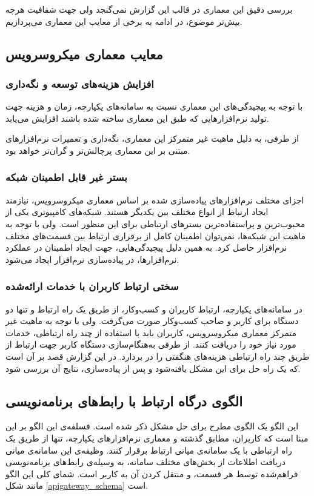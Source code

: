 بررسی دقیق این معماری در قالب این گزارش نمی‌گنجد ولی جهت شفافیت هرچه بیش‌تر موضوع، در ادامه به برخی از معایب این معماری می‌پردازیم.


\subsection{معایب معماری میکروسرویس}\label{subsec:intro_microissues}
\subsubsection{افزایش هزینه‌های توسعه و نگه‌داری}
با توجه به پیچیدگی‌های این معماری نسبت به سامانه‌های یکپارچه، زمان و هزینه جهت تولید نرم‌افزار‌هایی که طبق این معماری ساخته شده باشند افزایش می‌یابد.

از طرفی، به دلیل ماهیت غیر متمرکز این معماری، نگه‌داری و تعمیرات نرم‌افزار‌های مبتنی بر این معماری پرچالش‌تر و گران‌تر خواهد بود.

\subsubsection{بستر غیر قابل اطمینان شبکه}
اجزای مختلف نرم‌افزار‌های پیاده‌سازی شده بر اساس معماری میکروسرویس، نیازمند ایجاد ارتباط از انواع مختلف بین یکدیگر هستند. شبکه‌های کامپیوتری یکی از محبوب‌ترین و پراستفاده‌ترین بستر‌های ارتباطی برای این منظور است. ولی با توجه به ماهیت این شبکه‌ها، نمی‌توان اطمینان کامل از برقراری ارتباط بین قسمت‌های مختلف نرم‌افزار حاصل کرد. به همین دلیل پیچیدگی‌هایی، جهت ایجاد اطمینان در عملکرد نرم‌افزار‌ها، در پیاده‌سازی نرم‌افزار ایجاد می‌شود.


\subsubsection{سختی ارتباط کاربران با خدمات ارائه‌شده}
در سامانه‌های یکپارچه، ارتباط کاربران و کسب‌و‌کار، از طریق یک راه ارتباط و تنها دو دستگاه برای کاربر و صاحب کسب‌و‌کار صورت می‌گرفت. ولی با توجه به ماهیت غیر متمرکز معماری میکروسرویس، کاربران باید با استفاده‌ از چند راه ارتباطی، خدمات مورد نیاز خود را دریافت کنند. از طرفی به‌هنگام‌سازی دستگاه کاربر جهت ارتباط از طریق چند راه ارتباطی هزینه‌های هنگفتی را در بر‌دارد. در این گزارش قصد بر آن است که یک راه حل برای این مشکل یافته‌شود و پس از پیاده‌سازی، نتایج آن بررسی شود. 

\subsection{الگوی درگاه ارتباط با رابط‌های برنامه‌نویسی}
این الگو یک الگوی مطرح برای حل مشکل ذکر شده است. فسلفه‌ی این الگو بر این مبنا است که کاربران، مطابق گذشته و معماری نرم‌افزار‌های یکپارچه، تنها از طریق یک راه ارتباطی با یک سامانه‌ی میانی ارتباط برقرار کنند. وظیفه‌ی این سامانه‌ی میانی دریافت اطلاعات از بخش‌های مختلف سامانه، به وسیله‌ی رابط‌های برنامه‌نویسی فراهم‌شده توسط هر قسمت، و منتقل کردن آن به کاربر است. شمای کلی این الگو مانند شکل 
\ref{apigateway_schema}
 است.


